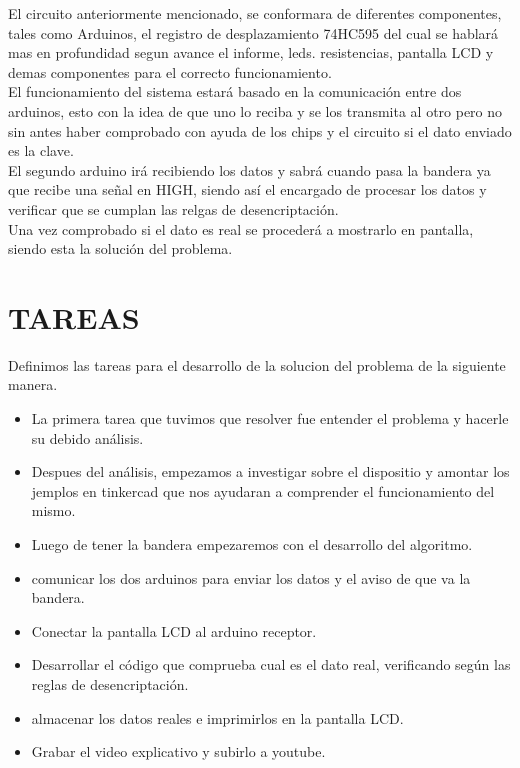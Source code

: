 \documentclass{article}
\begin{document}
El circuito anteriormente mencionado, se conformara de diferentes componentes, tales como Arduinos, el registro de desplazamiento 74HC595 del cual se hablará mas en profundidad segun avance el informe, leds. resistencias, pantalla LCD y demas componentes para el correcto funcionamiento.
\\

El funcionamiento del sistema estará basado en la comunicación entre dos arduinos, esto con la idea de que uno lo reciba y se los transmita al otro pero no sin antes haber comprobado con ayuda de los chips y el circuito si el dato enviado es la clave.
\\

El segundo arduino irá recibiendo los datos y sabrá cuando pasa la bandera ya que recibe una señal en HIGH, siendo así el encargado de procesar los datos y verificar que se cumplan las relgas de desencriptación.
\\

Una vez comprobado si el dato es real se procederá a mostrarlo en pantalla, siendo esta la solución del problema.



\newpage
\section{TAREAS}
\label{tareas}
Definimos las tareas para el desarrollo de la solucion del problema de la siguiente manera.

\begin{itemize}

    \item La primera tarea que tuvimos que resolver fue entender el problema y hacerle su debido análisis.
    
    \item Despues del análisis, empezamos a investigar sobre el dispositio y amontar los jemplos en tinkercad que nos ayudaran a comprender el funcionamiento del mismo.
    
    \item Luego de tener la bandera empezaremos con el desarrollo del algoritmo.
    
    \item comunicar los dos arduinos para enviar los datos y el aviso de que va la bandera.
    
    \item Conectar la pantalla LCD al arduino receptor.

    \item Desarrollar el código que comprueba cual es el dato real, verificando según las reglas de desencriptación. 
   
   \item almacenar los datos reales e imprimirlos en la pantalla LCD.
   
   \item Grabar el video explicativo y subirlo a youtube.

    
\end{itemize}
\end{document}
